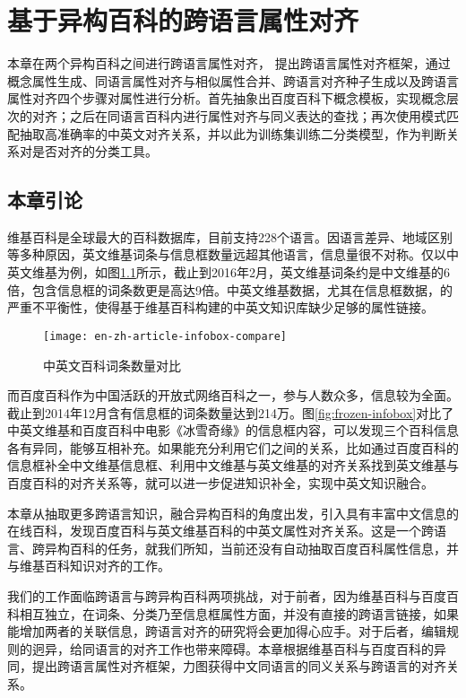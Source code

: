 \chapter{基于异构百科的跨语言属性对齐}
\label{cha:property-matching}
本章在两个异构百科之间进行跨语言属性对齐，
提出跨语言属性对齐框架，通过概念属性生成、同语言属性对齐与相似属性合并、跨语言对齐种子生成以及跨语言属性对齐四个步骤对属性进行分析。首先抽象出百度百科下概念模板，实现概念层次的对齐；之后在同语言百科内进行属性对齐与同义表达的查找；再次使用模式匹配抽取高准确率的中英文对齐关系，并以此为训练集训练二分类模型，作为判断关系对是否对齐的分类工具。 

\section{本章引论}
维基百科是全球最大的百科数据库，目前支持228个语言。因语言差异、地域区别等多种原因，英文维基词条与信息框数量远超其他语言，信息量很不对称。仅以中英文维基为例，如图\ref{fig:en-zh-article-infobox-compare}所示，截止到2016年2月，英文维基词条约是中文维基的6倍，包含信息框的词条数更是高达9倍。中英文维基数据，尤其在信息框数据，的严重不平衡性，使得基于维基百科构建的中英文知识库缺少足够的属性链接。

\begin{figure}[h]
  \centering
  \texttt{[image: en-zh-article-infobox-compare]}
  \caption{中英文百科词条数量对比}
  \label{fig:en-zh-article-infobox-compare}
\end{figure}


而百度百科作为中国活跃的开放式网络百科之一，参与人数众多，信息较为全面。截止到2014年12月含有信息框的词条数量达到214万。图\ref{fig:frozen-infobox}对比了中英文维基和百度百科中电影《冰雪奇缘》的信息框内容，可以发现三个百科信息各有异同，能够互相补充。如果能充分利用它们之间的关系，比如通过百度百科的信息框补全中文维基信息框、利用中文维基与英文维基的对齐关系找到英文维基与百度百科的对齐关系等，就可以进一步促进知识补全，实现中英文知识融合。

本章从抽取更多跨语言知识，融合异构百科的角度出发，引入具有丰富中文信息的在线百科，发现百度百科与英文维基百科的中英文属性对齐关系。这是一个跨语言、跨异构百科的任务，就我们所知，当前还没有自动抽取百度百科属性信息，并与维基百科知识对齐的工作。

我们的工作面临跨语言与跨异构百科两项挑战，对于前者，因为维基百科与百度百科相互独立，在词条、分类乃至信息框属性方面，并没有直接的跨语言链接，如果能增加两者的关联信息，跨语言对齐的研究将会更加得心应手。对于后者，编辑规则的迥异，给同语言的对齐工作也带来障碍。本章根据维基百科与百度百科的异同，提出跨语言属性对齐框架，力图获得中文同语言的同义关系与跨语言的对齐关系。


